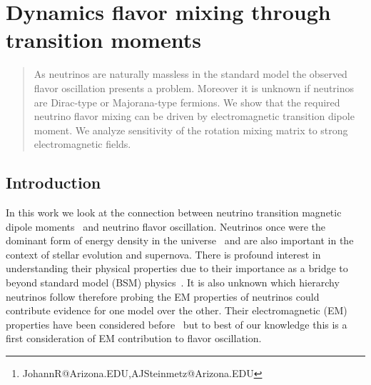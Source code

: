 \documentclass[addchapnum]{ws-rv961x669} %
\begin{document}
\chapter[Dynamics flavor mixing through transition moments]{Dynamics flavor mixing through transition moments\label{JR_ch1}}

\author[J. Rafelski and A. Steinmetz]{Johann Rafelski and Andrew Steinmetz\footnote{JohannR@Arizona.EDU,AJSteinmetz@Arizona.EDU}}

\address{Department of Physics, The University of Arizona, Tucson, AZ 85721, USA}

\begin{abstract} 
As neutrinos are naturally massless in the standard model the observed flavor oscillation presents a problem. Moreover it is unknown if neutrinos are Dirac-type or Majorana-type fermions. We show that the required neutrino flavor mixing can be driven by electromagnetic transition dipole moment. We analyze sensitivity of the rotation mixing matrix to strong electromagnetic fields.
\end{abstract}


\body


\section{Introduction}
\label{sec:intro}

In this work we look at the connection between neutrino transition magnetic dipole moments~\cite{Shrock:1980vy,Shrock:1982sc} and neutrino flavor oscillation. Neutrinos once were the dominant form of energy density in the universe~\cite{Rafelski:2023emw} and are also important in the context of stellar evolution and supernova. There is profound interest in understanding their physical properties due to their importance as a bridge to beyond standard model (BSM) physics~\cite{DUNE:2020fgq}. It is also unknown which hierarchy neutrinos follow therefore probing the EM properties of neutrinos could contribute evidence for one model over the other. Their electromagnetic (EM) properties have been considered before~\cite{Giunti:2014ixa} but to best of our knowledge this is a first consideration of EM contribution to flavor oscillation.
\end{document}
